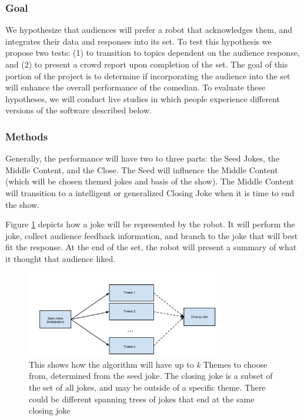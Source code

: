 \documentclass[onecolumn, draftclsnofoot,10pt, compsoc]{IEEEtran}
\begin{document}
\subsubsection{Goal}
We hypothesize that audiences will prefer a robot that acknowledges them, and integrates their data and responses into
its set. To test this hypothesis we propose two tests: (1) to transition to topics dependent on the audience response,
and (2) to present a crowd report upon completion of the set. The goal of this portion of the project is to determine
if incorporating the audience into the set will enhance the overall performance of the comedian. To evaluate these
hypotheses, we will conduct live studies in which people experience different versions of the software described below.
\subsubsection{Methods}
Generally, the performance will have two to three parts: the Seed Jokes, the Middle Content, and the Close. The Seed
will influence the Middle Content (which will be chosen themed jokes and basis of the show). The Middle Content will
transition to a intelligent or generalized Closing Joke when it is time to end the show.


Figure \ref{fig:joke} depicts how a joke will be represented by the robot. It will perform the joke, collect audience feedback
information, and branch to the joke that will best fit the response. At the end of the set, the robot will present a summary
of what it thought that audience liked.
\begin{figure}[H]
  \centering
  \includegraphics[width=0.75\textwidth,height=0.75\textheight,keepaspectratio]{fig0}
  \caption{This shows how the algorithm will have up to \textit{k} Themes to choose from, determined from the seed joke. The closing joke is a subset of the set of all jokes, and may be outside of a specific theme. There could be different spanning trees of jokes that end at the same closing joke}
  \label{fig:joke}
\end{figure}
\end{document}
